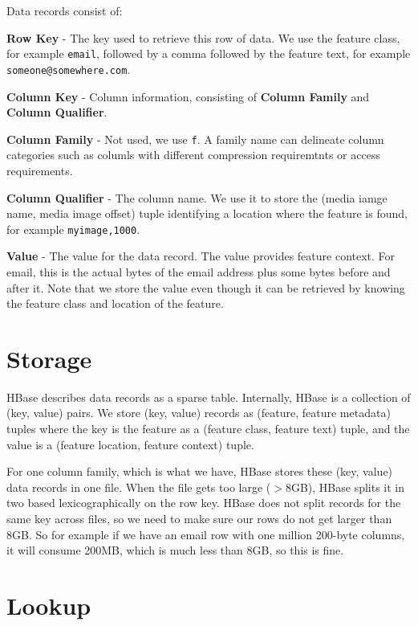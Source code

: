 \documentclass[12pt,twoside]{article}
\begin{document}
Data records consist of:
\begin{compactitem}
\item \textbf{Row Key} - The key used to retrieve this row of data. We use the feature class, for example \texttt{email}, followed by a comma followed by the feature text, for example \texttt{someone@somewhere.com}.
\item \textbf{Column Key} - Column information, consisting of \textbf{Column Family} and \textbf{Column Qualifier}.
  \begin{compactitem}
  \item \textbf{Column Family} - Not used, we use \texttt{f}. A family name can delineate column categories such as columls with different compression requiremtnts or access requirements.
  \item \textbf{Column Qualifier} - The column name.  We use it to store the (media iamge name, media image offset) tuple identifying a location where the feature is found, for example \texttt{myimage,1000}.
  \end{compactitem}
\item \textbf{Value} - The value for the data record.  The value provides feature context. For email, this is the actual bytes of the email address plus some bytes before and after it. Note that we store the value even though it can be retrieved by knowing the feature class and location of the feature.
\end{compactitem}

\section{Storage}
HBase describes data records as a sparse table. Internally, HBase is a collection of (key, value) pairs. We store (key, value) records as (feature, feature metadata) tuples where the key is the feature as a (feature class, feature text) tuple, and the value is a (feature location, feature context) tuple.

For one column family, which is what we have, HBase stores these (key, value) data records in one file.
When the file gets too large ($>$8GB), HBase splits it in two based lexicographically on the row key.  HBase does not split records for the same key across files, so we need to make sure our rows do not get larger than 8GB.  So for example if we have an email row with one million 200-byte columns, it will consume 200MB, which is much less than 8GB, so this is fine.

\section{Lookup}
\end{document}
